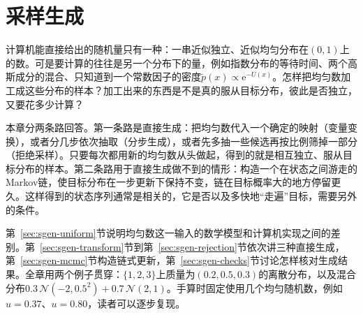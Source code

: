 \chapter{采样生成}
\label{chap:sample-generation}

计算机能直接给出的随机量只有一种：一串近似独立、近似均匀分布在$(0,1)$上的数。可是要计算的往往是另一个分布下的量，例如指数分布的等待时间、两个高斯成分的混合、只知道到一个常数因子的密度$\widetilde{p}(x)\propto\mathrm{e}^{-U(x)}$。怎样把均匀数加工成这些分布的样本？加工出来的东西是不是真的服从目标分布，彼此是否独立，又要花多少计算？

本章分两条路回答。第一条路是直接生成：把均匀数代入一个确定的映射（变量变换），或者分几步依次抽取（分步生成），或者先多抽一些候选再按比例筛掉一部分（拒绝采样）。只要每次都用新的均匀数从头做起，得到的就是相互独立、服从目标分布的样本。第二条路用于直接生成做不到的情形：构造一个在状态之间游走的Markov链，使目标分布在一步更新下保持不变，链在目标概率大的地方停留更久。这样得到的状态序列通常是相关的，它是否以及多快地“走遍”目标，需要另外的条件。

第~\ref{sec:sgen-uniform}节说明均匀数这一输入的数学模型和计算机实现之间的差别。第~\ref{sec:sgen-transform}节到第~\ref{sec:sgen-rejection}节依次讲三种直接生成，第~\ref{sec:sgen-mcmc}节构造链式更新，第~\ref{sec:sgen-checks}节讨论怎样核对生成结果。全章用两个例子贯穿：$\{1,2,3\}$上质量为$(0.2,0.5,0.3)$的离散分布，以及混合分布$0.3\,\mathcal{N}(-2,0.5^{2})+0.7\,\mathcal{N}(2,1)$。手算时固定使用几个均匀随机数，例如$u=0.37$、$u=0.80$，读者可以逐步复现。








